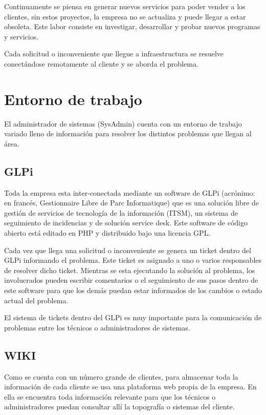 \documentclass[12pt,a4paper]{article}
\begin{document}
Continuamente se piensa en generar nuevos servicios para poder vender a los clientes, sin estos proyectos, la empresa no se actualiza y puede llegar a estar obsoleta. Este labor consiste en investigar, desarrollar y probar nuevos programas y servicios.

Cada solicitud o inconveniente que llegue a infraestructura se resuelve conectándose remotamente al cliente y se aborda el problema.

\section{Entorno de trabajo}
El administrador de sistemas (SysAdmin) cuenta con un entorno de trabajo variado lleno de información para resolver los distintos problemas que llegan al área.

\subsection{GLPi}
Toda la empresa esta inter-conectada mediante un software de GLPi (acrónimo: en francés, Gestionnaire Libre de Parc Informatique) que es una solución libre de gestión de servicios de tecnología de la información (ITSM), un sistema de seguimiento de incidencias y de solución service desk. Este software de código abierto está editado en PHP y distribuido bajo una licencia GPL. \cite{GLPi}

Cada vez que llega una solicitud o inconveniente se genera un ticket dentro del GLPi informando el problema. Este ticket es asignado a uno o varios responsables de resolver dicho ticket. Mientras se esta ejecutando la solución al problema, los involucrados pueden escribir comentarios o el seguimiento de sus pasos dentro de este software para que los demás puedan estar informados de los cambios o estado actual del problema.

El sistema de tickets dentro del GLPi es muy importante para la comunicación de problemas entre los técnicos o administradores de sistemas.  

\subsection{WIKI}
Como se cuenta con un número grande de clientes, para almacenar toda la información de cada cliente se usa una plataforma web propia de la empresa. En ella se encuentra toda información relevante para que los técnicos o administradores puedan consultar allí la topografía o sistemas del cliente. 
\end{document}
